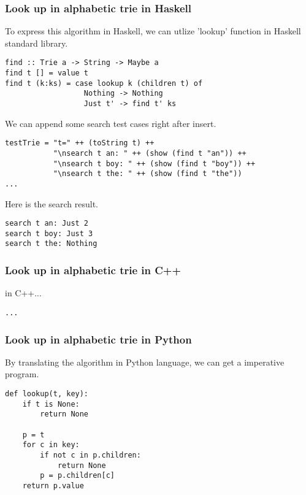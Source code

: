 \documentclass{article}
\begin{document}
\subsubsection*{Look up in alphabetic trie in Haskell}
To express this algorithm in Haskell, we can utlize 'lookup' function
in Haskell standard library\cite{wiki-trie}.

\lstset{language=Haskell}
\begin{lstlisting}
find :: Trie a -> String -> Maybe a
find t [] = value t
find t (k:ks) = case lookup k (children t) of
                  Nothing -> Nothing
                  Just t' -> find t' ks
\end{lstlisting}

We can append some search test cases right after insert.

\begin{lstlisting}
testTrie = "t=" ++ (toString t) ++ 
           "\nsearch t an: " ++ (show (find t "an")) ++
           "\nsearch t boy: " ++ (show (find t "boy")) ++
           "\nsearch t the: " ++ (show (find t "the"))
...
\end{lstlisting}

Here is the search result.

\begin{verbatim}
search t an: Just 2
search t boy: Just 3
search t the: Nothing
\end{verbatim}

\subsubsection*{Look up in alphabetic trie in C++}
in C++...

\lstset{language=C++}
\begin{lstlisting}
...
\end{lstlisting}


\subsubsection*{Look up in alphabetic trie in Python}
By translating the algorithm in Python language, we can get 
a imperative program.

\lstset{language=Python}
\begin{lstlisting}
def lookup(t, key):
    if t is None:
        return None

    p = t
    for c in key:
        if not c in p.children:
            return None
        p = p.children[c]
    return p.value
\end{lstlisting}
\end{document}
